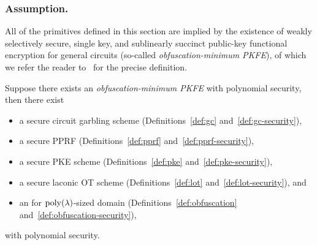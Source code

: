 \subsubsection{Assumption.}
All of the primitives defined in this section are implied by the existence of
weakly selectively secure, single key, and sublinearly succinct
public-key functional encryption for general circuits
(so-called \emph{obfuscation-minimum PKFE}),
of which we refer the reader to~\cite{C:KNTY19} for the precise definition.

\begin{lemma}
Suppose there exists an \emph{obfuscation-minimum PKFE} with polynomial security, then there exist
\begingroup
{}
\begin{itemize}
\item {}
a secure circuit garbling scheme (Definitions~\ref{def:gc} and~\ref{def:gc-security}),
\item {}
a secure PPRF (Definitions~\ref{def:pprf} and~\ref{def:pprf-security}),
\item {}
a secure PKE scheme (Definitions~\ref{def:pke} and~\ref{def:pke-security}),
\item {}
a secure laconic OT scheme (Definitions~\ref{def:lot} and~\ref{def:lot-security}), and
\item {}
an {\iO} for $\operatorname{poly}(\lambda)$-sized domain (Definitions~\ref{def:obfuscation} and~\ref{def:obfuscation-security}),
\end{itemize}
with polynomial security.
\endgroup
\end{lemma}
